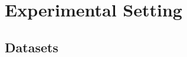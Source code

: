 \documentclass[runningheads]{llncs}
\begin{document}


\section{Experimental Setting}
\subsection{Datasets}
\end{document}
